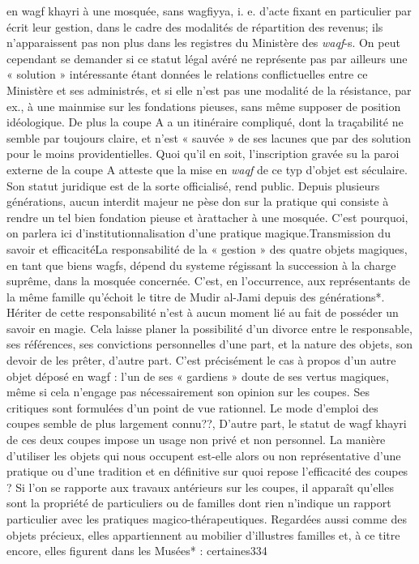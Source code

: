 en wagf khayri à une mosquée, sans wagfiyya, i. e. d'acte fixant en particulier par écrit leur gestion, dans le cadre des modalités de répartition des revenus; ils n'apparaissent pas non plus dans les registres du Ministère des \textit{waqf}-s. On peut cependant se demander si ce statut légal avéré ne représente pas par ailleurs une « solution » intéressante étant données le relations conflictuelles entre ce Ministère et ses administrés, et si elle n'est pas une modalité de la résistance, par ex., à une mainmise sur les fondations pieuses, sans même supposer de position idéologique. De plus la coupe A a un itinéraire compliqué, dont la traçabilité ne semble par toujours claire, et n'est « sauvée » de ses lacunes que par des solution pour le moins providentielles. Quoi qu'il en soit, l'inscription gravée su la paroi externe de la coupe A atteste que la mise en \textit{waqf} de ce typ d'objet est séculaire. Son statut juridique est de la sorte officialisé, rend public. Depuis plusieurs générations, aucun interdit majeur ne pèse don sur la pratique qui consiste à rendre un tel bien fondation pieuse et àrattacher à une mosquée. C'est pourquoi, on parlera ici d'institutionnalisation d'une pratique magique.Transmission du savoir et efficacitéLa responsabilité de la « gestion » des quatre objets magiques, en tant que biens wagfs, dépend du systeme régissant la succession à la charge suprême, dans la mosquée concernée. C'est, en l'occurrence, aux représentants de la même famille qu'échoit le titre de Mudir al-Jami depuis des générations*. Hériter de cette responsabilité n'est à aucun moment lié au fait de posséder un savoir en magie. Cela laisse planer la possibilité d'un divorce entre le responsable, ses références, ses convictions personnelles d'une part, et la nature des objets, son devoir de les prêter, d'autre part.
C'est précisément le cas à propos d'un autre objet déposé en wagf : l'un de ses « gardiens » doute de ses vertus magiques, même si cela n'engage pas nécessairement son opinion sur les coupes. Ses critiques sont formulées d'un point de vue rationnel. Le mode d'emploi des coupes semble de plus largement connu??, D'autre part, le statut de wagf khayri de ces deux coupes impose un usage non privé et non personnel. La manière d'utiliser les objets qui nous occupent est-elle alors ou non représentative d'une pratique ou d'une tradition et en définitive sur quoi repose l'efficacité des coupes ?
Si l'on se rapporte aux travaux antérieurs sur les coupes, il apparaît qu'elles sont la propriété de particuliers ou de familles dont rien n'indique un rapport particulier avec les pratiques magico-thérapeutiques. Regardées aussi comme des objets précieux, elles appartiennent au mobilier d'illustres familles et, à ce titre encore, elles figurent dans les Musées* : certaines334
